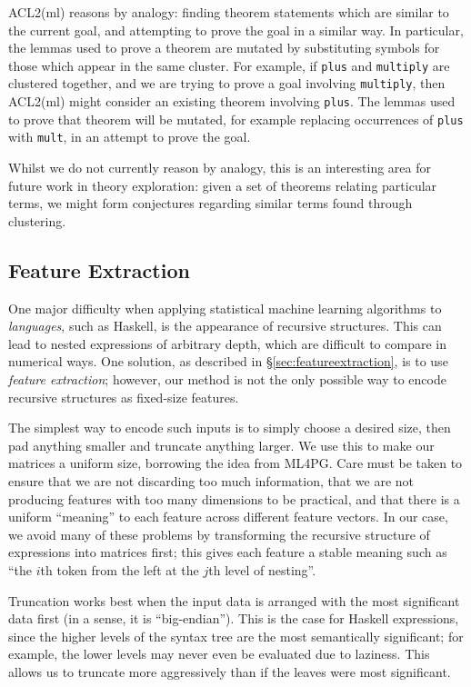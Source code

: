 ACL2(ml) reasons by analogy: finding theorem statements which are similar to the current goal, and attempting to prove the goal in a similar way. In particular, the lemmas used to prove a theorem are mutated by substituting symbols for those which appear in the same cluster. For example, if \texttt{plus} and \texttt{multiply} are clustered together, and we are trying to prove a goal involving \texttt{multiply}, then ACL2(ml) might consider an existing theorem involving \texttt{plus}. The lemmas used to prove that theorem will be mutated, for example replacing occurrences of \texttt{plus} with \texttt{mult}, in an attempt to prove the goal.

Whilst we do not currently reason by analogy, this is an interesting area for future work in theory exploration: given a set of theorems relating particular terms, we might form conjectures regarding similar terms found through clustering.

\iffalse
We could expand this a bit, e.g. talking about how we both use Weka, etc.
\fi

\subsection{Feature Extraction}

One major difficulty when applying statistical machine learning algorithms to \emph{languages}, such as Haskell, is the appearance of recursive structures. This can lead to nested expressions of arbitrary depth, which are difficult to compare in numerical ways. One solution, as described in \S \ref{sec:featureextraction}, is to use \emph{feature extraction}; however, our method is not the only possible way to encode recursive structures as fixed-size features.

The simplest way to encode such inputs is to simply choose a desired size, then pad anything smaller and truncate anything larger. We use this to make our matrices a uniform size, borrowing the idea from ML4PG. Care must be taken to ensure that we are not discarding too much information, that we are not producing features with too many dimensions to be practical, and that there is a uniform ``meaning'' to each feature across different feature vectors. In our case, we avoid many of these problems by transforming the recursive structure of expressions into matrices first; this gives each feature a stable meaning such as ``the $i$th token from the left at the $j$th level of nesting''.

Truncation works best when the input data is arranged with the most significant data first (in a sense, it is ``big-endian''). This is the case for Haskell expressions, since the higher levels of the syntax tree are the most semantically significant; for example, the lower levels may never even be evaluated due to laziness. This allows us to truncate more aggressively than if the leaves were most significant.

